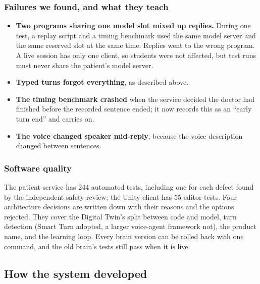 \documentclass[10pt]{article}
\begin{document}
\subsubsection{Failures we found, and what they teach}
\begin{itemize}
\item \textbf{Two programs sharing one model slot mixed up replies.} During one test, a replay script and a timing benchmark used the same model server and the same reserved slot at the same time. Replies went to the wrong program. A live session has only one client, so students were
not affected, but test runs must never share the patient's model server.
\item \textbf{Typed turns forgot everything}, as described above.
\item \textbf{The timing benchmark crashed} when the service decided the doctor had finished before the recorded sentence ended; it now records
this as an ``early turn end'' and carries on.
\item \textbf{The voice changed speaker mid-reply}, because the voice description changed between sentences.
\end{itemize}

\subsubsection{Software quality}
The patient service has 244 automated tests, including one for each defect found by the independent safety review; the Unity client has 55
editor tests. Four architecture decisions are written down with their reasons and the options rejected. They cover the Digital Twin's split between code and model, turn detection (Smart Turn adopted, a larger voice-agent framework not), the product name, and the learning loop. Every brain version can be rolled back with one command, and the old brain's tests still pass when it is
live.


\subsection{How the system developed}
\end{document}
